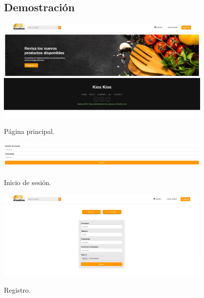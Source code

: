 \documentclass{article}
\newenvironment{block}{\captionsetup{type=listing}}{}
\begin{document}
\subsection{Demostración}
\begin{block}
	\centering
	\includegraphics[width=0.8\textwidth]{img/E1.png}
	\caption{Página principal.}
	\includegraphics[width=0.8\textwidth]{img/E2.png}
	\caption{Inicio de sesión.}
	\includegraphics[width=0.8\textwidth]{img/E3.png}
	\caption{Registro.}
\end{block}
\pagebreak
\end{document}
